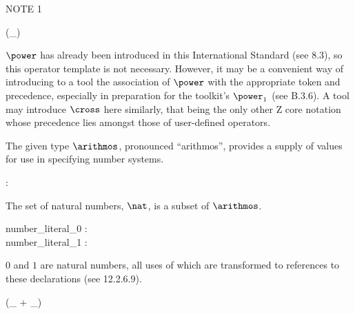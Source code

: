 \documentclass{article}
\begin{document}
%

NOTE 1
\begin{zed}
\generic (\power \_)
\end{zed}
$\power$ has already been introduced in this International Standard
(see 8.3),
so this operator template is not necessary.
However, it may be a convenient way of introducing to a tool
the association of $\power$ with the appropriate token and precedence,
especially in preparation for the toolkit's $\power_1$ (see B.3.6).
A tool may introduce $\cross$ here similarly,
that being the only other Z core notation whose precedence
lies amongst those of user-defined operators.


\begin{zed}
[\arithmos]
\end{zed}

The given type $\arithmos$, pronounced ``arithmos'', provides
a supply of values for use in specifying number systems.

\begin{axdef}
\nat : \power \arithmos
\end{axdef}

The set of natural numbers, $\nat$, is a subset of $\arithmos$.


\begin{axdef}
  number\_literal\_0 : \nat\\
  number\_literal\_1 : \nat
\end{axdef}

$0$ and $1$ are natural numbers, all uses of which are transformed
to references to these declarations (see 12.2.6.9).

\begin{zed}
 \leftassoc (\_ + \_)
\end{zed}
\end{document}
